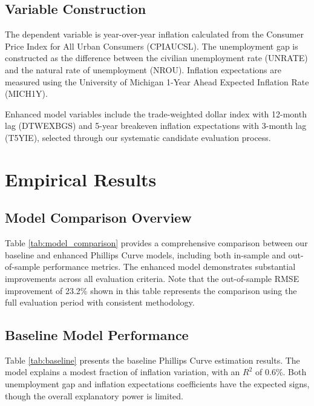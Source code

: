 \documentclass[12pt]{article}
\begin{document}
\subsection{Variable Construction}

The dependent variable is year-over-year inflation calculated from the Consumer Price Index for All Urban Consumers (CPIAUCSL). The unemployment gap is constructed as the difference between the civilian unemployment rate (UNRATE) and the natural rate of unemployment (NROU). Inflation expectations are measured using the University of Michigan 1-Year Ahead Expected Inflation Rate (MICH1Y).

Enhanced model variables include the trade-weighted dollar index with 12-month lag (DTWEXBGS) and 5-year breakeven inflation expectations with 3-month lag (T5YIE), selected through our systematic candidate evaluation process.

\section{Empirical Results}

\subsection{Model Comparison Overview}

Table \ref{tab:model_comparison} provides a comprehensive comparison between our baseline and enhanced Phillips Curve models, including both in-sample and out-of-sample performance metrics. The enhanced model demonstrates substantial improvements across all evaluation criteria. Note that the out-of-sample RMSE improvement of 23.2\% shown in this table represents the comparison using the full evaluation period with consistent methodology.



\subsection{Baseline Model Performance}

Table \ref{tab:baseline} presents the baseline Phillips Curve estimation results. The model explains a modest fraction of inflation variation, with an $R^2$ of 0.6\%. Both unemployment gap and inflation expectations coefficients have the expected signs, though the overall explanatory power is limited.
\end{document}
